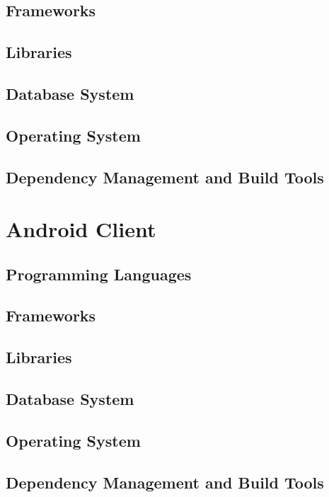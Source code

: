 \documentclass[11pt,fleqn]{book} %
\begin{document}
		\subsection{Frameworks}
		\subsection{Libraries}
		\subsection{Database System}
		\subsection{Operating System}
		\subsection{Dependency Management and Build Tools}
	\section{Android Client}
		\subsection{Programming Languages}
		\subsection{Frameworks}
		\subsection{Libraries}
		\subsection{Database System}
		\subsection{Operating System}
		\subsection{Dependency Management and Build Tools}	
	
	

\end{document}
